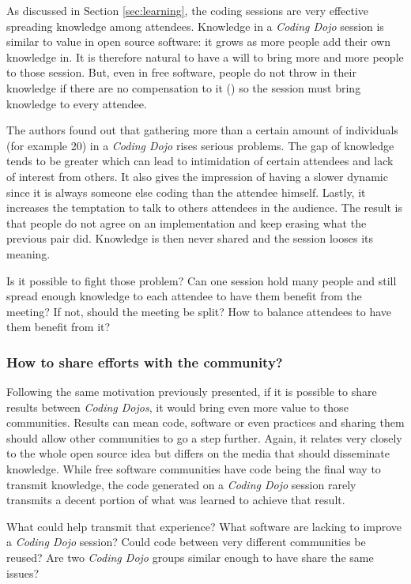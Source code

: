 As discussed in Section \ref{sec:learning}, the coding sessions
are very effective spreading knowledge among attendees. Knowledge in a
\textit{Coding Dojo} session is similar to value in open source
software: it grows as more people add their own knowledge in. It is
therefore natural to have a will to bring more and more people to
those session. But, even in free software, people do not throw in
their knowledge if there are no compensation to it
(\cite{RishabGhosh}) so the session must bring knowledge to every
attendee.

The authors found out that gathering more than a certain amount of
individuals (for example 20) in a \textit{Coding Dojo} rises serious
problems. The gap of knowledge tends to be greater which can lead to
intimidation of certain attendees and lack of interest from others. It
also gives the impression of having a slower dynamic since it is
always someone else coding than the attendee himself. Lastly, it
increases the temptation to talk to others attendees in the
audience. The result is that people do not agree on an implementation
and keep erasing what the previous pair did. Knowledge is then never
shared and the session looses its meaning.

Is it possible to fight those problem? Can one session hold many
people and still spread enough knowledge to each attendee to have them
benefit from the meeting? If not, should the meeting be split? How
to balance attendees to have them benefit from it?

\subsubsection{How to share efforts with the community?}

Following the same motivation previously presented, if it is possible
to share results between \textit{Coding Dojos}, it would bring even
more value to those communities. Results can mean code, software or
even practices and sharing them should allow other communities to go a
step further. Again, it relates very closely to the whole open source
idea but differs on the media that should disseminate knowledge. While
free software communities have code being the final way to transmit
knowledge, the code generated on a \textit{Coding Dojo} session rarely
transmits a decent portion of what was learned to achieve that result.

What could help transmit that experience? What software are lacking to
improve a \textit{Coding Dojo} session? Could code between very
different communities be reused? Are two \textit{Coding Dojo} groups
similar enough to have share the same issues?

